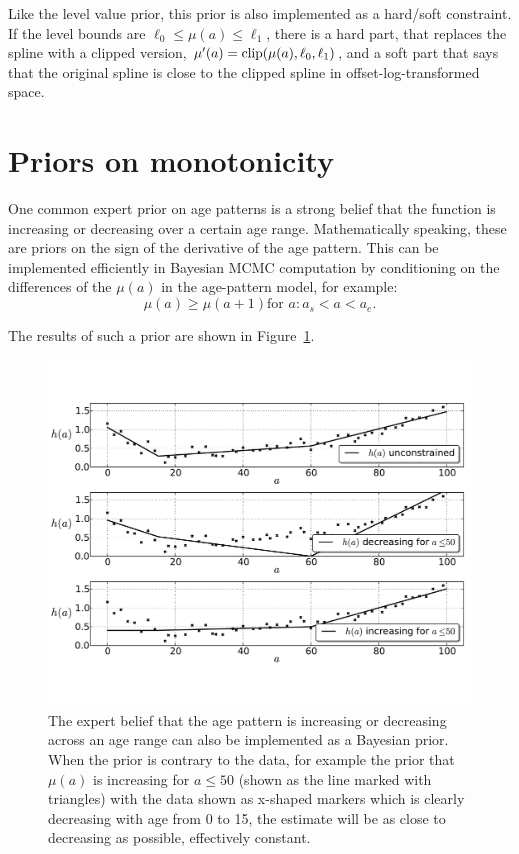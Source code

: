 Like the level value prior, this prior is also implemented as a
hard/soft constraint.  If the level bounds are $\ell_0 \leq \mu(a)
\leq \ell_1$, there is a hard part, that replaces the spline with a
clipped version, $\mu'(a) = \operatorname{clip}(\mu(a), \ell_0, \ell_1)$, and a
soft part that says that the original spline is close to the clipped
spline in offset-log-transformed space.

\section{Priors on monotonicity}

One common expert prior on age patterns is a strong belief that the
function is increasing or decreasing over a certain age
range. Mathematically speaking, these are priors on the sign of the
derivative of the age pattern.  This can be implemented efficiently in
Bayesian MCMC computation by conditioning on the differences of the
$\mu(a)$ in the age-pattern model, for example:
\[
\mu(a) \geq \mu(a+1) \text{for } a : a_s < a < a_e.
\]

The results of such a prior are shown in
Figure~\ref{monotone-age-pattern}.


\begin{figure}[h]
\begin{center}
\includegraphics[width=\textwidth]{monotone-smoothing-splines.pdf}
\caption{The expert belief that the age pattern
is increasing or decreasing across an age range can also be
implemented as a Bayesian prior.  When the prior is contrary to the
data, for example the prior that $\mu(a)$ is increasing for $a \leq
50$ (shown as the line marked with triangles) with the data shown as
x-shaped markers which is clearly decreasing with age from 0 to 15,
the estimate will be as close to decreasing as possible, effectively
constant.}
\label{monotone-age-pattern}
\end{center}
\end{figure}


